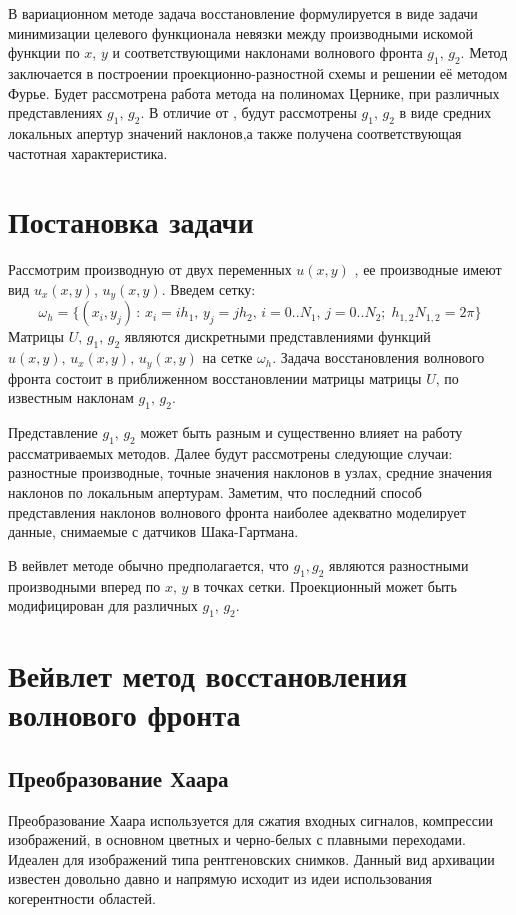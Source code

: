 \documentclass{article}
\begin{document}
В вариационном методе задача восстановление формулируется в виде задачи минимизации целевого функционала невязки между производными искомой функции по $x,\,y$ и соответствующими наклонами волнового фронта $g_1,\, g_2$. Метод заключается в построении проекционно-разностной схемы и решении её методом Фурье. Будет рассмотрена работа метода на полиномах Цернике, при различных представлениях $g_1,\,g_2$. В отличие от \cite{vatiational_base}, будут рассмотрены $g_1,\,g_2$ в виде средних локальных апертур значений наклонов,а также получена соответствующая частотная характеристика.
\newpage

\section{Постановка задачи}
Рассмотрим производную от двух переменных $u(x,y)$ , ее производные имеют вид  $u_x(x,y)$, $u_y(x,y)$.
Введем сетку: 
\begin{equation}
\omega_h = \{(x_i, y_j) \,:\, x_i = ih_1,\,y_j = jh_2,\, i = 0..N_1,\, j = 0..N_2;\; h_{1,2}N_{1,2} = 2\pi\}
\end{equation}
Матрицы $U,\, g_1,\, g_2$ являются дискретными представлениями функций $u(x,y) ,\, u_x(x,y) ,\, u_y(x,y)$ на сетке $\omega_h$. Задача восстановления волнового фронта состоит в приближенном восстановлении  матрицы матрицы $U$, по известным наклонам $g_1,\, g_2$.

Представление $g_1 ,\, g_2$ может быть разным и существенно влияет на работу рассматриваемых методов. Далее будут рассмотрены следующие случаи: разностные производные, точные значения наклонов в узлах, средние значения наклонов по локальным апертурам. Заметим, что последний способ представления наклонов волнового фронта наиболее адекватно моделирует данные, снимаемые с датчиков Шака-Гартмана.

В вейвлет методе обычно предполагается, что $g_1, g_2$ являются разностными производными вперед по $x,\,y$ в точках сетки. Проекционный может быть модифицирован для различных $g_1, \, g_2$.
\section{Вейвлет метод восстановления волнового фронта}
\subsection{Преобразование Хаара} 
Преобразование Хаара используется для сжатия входных сигналов, компрессии изображений, в основном цветных и черно-белых с плавными переходами. Идеален для изображений типа рентгеновских снимков. Данный вид архивации известен довольно давно и напрямую исходит из идеи использования когерентности областей.
\end{document}
